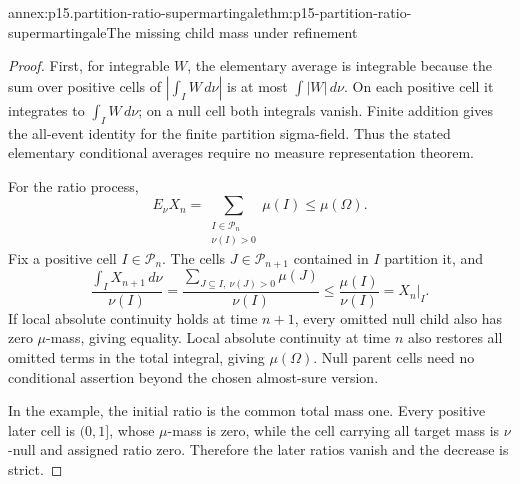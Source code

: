 \begin{annexitem}{annex:p15.partition-ratio-supermartingale}{thm:p15-partition-ratio-supermartingale}{The missing child mass under refinement}
\begin{proof}
First, for integrable \(W\), the elementary average is integrable
because the sum over positive cells of \(\left|\int_IW\,d\nu\right|\)
is at most \(\int|W|\,d\nu\). On each positive cell it integrates
to \(\int_IW\,d\nu\); on a null cell both integrals vanish.
Finite addition gives the all-event identity for the finite
partition sigma-field. Thus the stated elementary conditional
averages require no measure representation theorem.

For the ratio process,
\[
 E_\nu X_n=\sum_{\substack{I\in\mathcal P_n\\\nu(I)>0}}\mu(I)
                                                \leq\mu(\Omega).
\]
Fix a positive cell \(I\in\mathcal P_n\). The cells
\(J\in\mathcal P_{n+1}\) contained in \(I\) partition it, and
\[
 \frac{\int_I X_{n+1}\,d\nu}{\nu(I)}
    =\frac{\sum_{J\subseteq I,\ \nu(J)>0}\mu(J)}{\nu(I)}
    \leq\frac{\mu(I)}{\nu(I)}=X_n|_I.
\]
If local absolute continuity holds at time \(n+1\), every omitted
null child also has zero \(\mu\)-mass, giving equality.
Local absolute continuity at time \(n\) also restores all omitted
terms in the total integral, giving \(\mu(\Omega)\).
Null parent cells need no conditional assertion beyond the chosen
almost-sure version.

In the example, the initial ratio is the common total mass one.
Every positive later cell is \((0,1]\), whose \(\mu\)-mass is zero,
while the cell carrying all target mass is \(\nu\)-null and assigned
ratio zero. Therefore the later ratios vanish and the decrease is strict.
\end{proof}
\end{annexitem}

